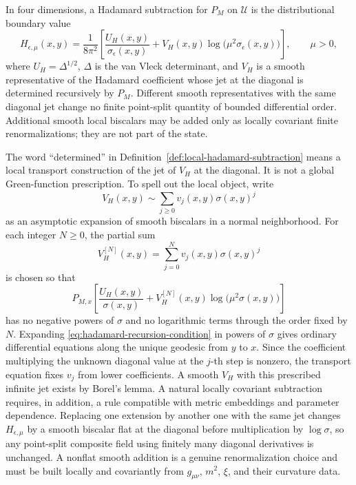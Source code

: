 \begin{definition}
\label{def:local-hadamard-subtraction}
In four dimensions, a Hadamard subtraction for \(P_M\) on
\(\mathcal U\) is the distributional boundary value
\begin{equation}
  H_{\epsilon,\mu}(x,y)
  =
  \frac{1}{8\pi^2}
  \left[
    \frac{U_H(x,y)}{\sigma_\epsilon(x,y)}
    +V_H(x,y)\log\!\bigl(\mu^2\sigma_\epsilon(x,y)\bigr)
  \right],
  \qquad \mu>0,
  \label{eq:point-splitting-hadamard-subtraction}
\end{equation}
where \(U_H=\Delta^{1/2}\), \(\Delta\) is the van Vleck determinant, and
\(V_H\) is a smooth representative of the Hadamard coefficient whose jet at
the diagonal is determined recursively by \(P_M\).  Different smooth
representatives with the same diagonal jet change no finite point-split
quantity of bounded differential order.  Additional smooth local biscalars
may be added only as locally covariant finite renormalizations; they are not
part of the state.
\end{definition}

The word ``determined'' in
Definition~\ref{def:local-hadamard-subtraction} means a local transport
construction of the jet of \(V_H\) at the diagonal.  It is not a global
Green-function prescription.  To spell out the local object, write
\begin{equation}
  V_H(x,y)\sim \sum_{j\ge0}v_j(x,y)\sigma(x,y)^j
  \label{eq:hadamard-v-asymptotic-expansion}
\end{equation}
as an asymptotic expansion of smooth biscalars in a normal neighborhood.
For each integer \(N\ge0\), the partial sum
\begin{equation}
  V_H^{[N]}(x,y)=\sum_{j=0}^{N}v_j(x,y)\sigma(x,y)^j
  \label{eq:hadamard-v-partial-sum}
\end{equation}
is chosen so that
\begin{equation}
  P_{M,x}\left[
    \frac{U_H(x,y)}{\sigma(x,y)}
    +
    V_H^{[N]}(x,y)\log\!\bigl(\mu^2\sigma(x,y)\bigr)
  \right]
  \label{eq:hadamard-recursion-condition}
\end{equation}
has no negative powers of \(\sigma\) and no logarithmic terms through the
order fixed by \(N\).  Expanding
\eqref{eq:hadamard-recursion-condition} in powers of \(\sigma\) gives
ordinary differential equations along the unique geodesic from \(y\) to
\(x\).  Since the coefficient multiplying the unknown diagonal value at the
\(j\)-th step is nonzero, the transport equation fixes \(v_j\) from lower
coefficients.  A smooth \(V_H\) with this prescribed infinite jet exists by
Borel's lemma.  A natural locally covariant subtraction requires, in addition,
a rule compatible with metric embeddings and parameter dependence.  Replacing
one extension by another one with the same jet changes \(H_{\epsilon,\mu}\) by
a smooth biscalar flat at the diagonal before multiplication by
\(\log\sigma\), so any point-split composite field using finitely many
diagonal derivatives is unchanged.  A nonflat smooth addition is a genuine
renormalization choice and must be built locally and covariantly from
\(g_{\mu\nu}\), \(m^2\), \(\xi\), and their curvature data.

